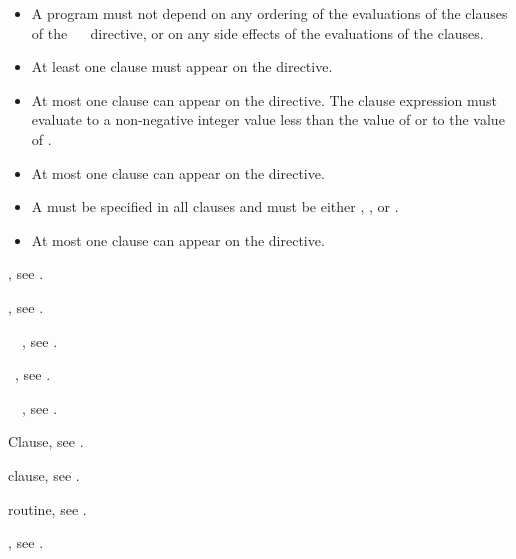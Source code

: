 \restrictions
\begin{itemize}
\item A program must not depend on any ordering of the evaluations of the clauses 
      of the ~~ directive, or on any side effects 
      of the evaluations of the clauses.
\item At least one  clause must appear on the directive.
\item At most one  clause can appear on the directive. The 
       clause expression must evaluate to a non-negative integer 
      value less than the value of  or to the 
      value of .
\item At most one  clause can appear on the directive.
\item A  must be specified in all  clauses and must be 
      either , , or .
\item At most one  clause can appear on the directive.
\end{itemize}

\begin{crossrefs}
\item {}, see .

\item {}, see .

\item {}~~,
see .

\item {}~, see .

\item {}~~,
see .

\item {} Clause, see .

\item {} clause, see .

\item {} routine, see .

\item {}, see
.

\end{crossrefs}



